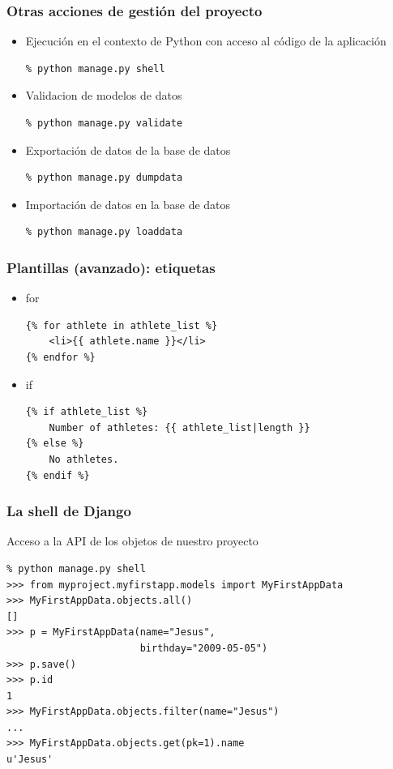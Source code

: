 \begin{frame}[fragile]
\frametitle{Otras acciones de gestión del proyecto}

\begin{itemize}
\item Ejecución en el contexto de Python con acceso al código de la aplicación
\begin{verbatim}
% python manage.py shell
\end{verbatim}
\item Validacion de modelos de datos
\begin{verbatim}
% python manage.py validate
\end{verbatim}
\item Exportación de datos de la base de datos
\begin{verbatim}
% python manage.py dumpdata
\end{verbatim}
\item Importación de datos en la base de datos
\begin{verbatim}
% python manage.py loaddata
\end{verbatim}
\end{itemize}

\end{frame}


\begin{frame}[fragile]
\frametitle{Plantillas (avanzado): etiquetas}

\begin{itemize}
\item for
\begin{verbatim}
{% for athlete in athlete_list %}
    <li>{{ athlete.name }}</li>
{% endfor %}
\end{verbatim}
\item if
\begin{verbatim}
{% if athlete_list %}
    Number of athletes: {{ athlete_list|length }}
{% else %}
    No athletes.
{% endif %}
\end{verbatim}

\end{itemize}
\end{frame}


\begin{frame}[fragile]
\frametitle{La shell de Django}

Acceso a la API de los objetos de nuestro proyecto

\begin{verbatim}
% python manage.py shell
>>> from myproject.myfirstapp.models import MyFirstAppData
>>> MyFirstAppData.objects.all()
[]
>>> p = MyFirstAppData(name="Jesus",
                       birthday="2009-05-05")
>>> p.save()
>>> p.id
1
>>> MyFirstAppData.objects.filter(name="Jesus")
...
>>> MyFirstAppData.objects.get(pk=1).name
u'Jesus'
\end{verbatim}

\end{frame}




